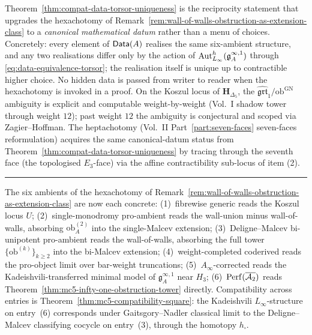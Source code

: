 \begin{remark}
\label{rem:compat-data-reciprocity-canonical}
%
Theorem~\textup{\ref{thm:compat-data-torsor-uniqueness}} is the
reciprocity statement that upgrades the hexachotomy of
Remark~\textup{\ref{rem:wall-of-walls-obstruction-as-extension-class}}
to a \emph{canonical mathematical datum} rather than a menu of choices.
Concretely: every element of $\mathsf{Data}(A)$ realises the same six-ambient
structure, and any two realisations differ only by the action of
$\operatorname{Aut}^h_{L_\infty}(\mathfrak g^{\infty,1}_A)$ through
\eqref{eq:data-equivalence-torsor}; the realisation itself is unique up
to contractible higher choice. No hidden data is passed from writer to
reader when the hexachotomy is invoked in a proof. On the Koszul locus
of $\mathbf H_{\Delta_5}$, the $\widehat{\mathfrak{grt}}_1/\mathrm{ob}^{\mathrm{GN}}$
ambiguity is explicit and computable weight-by-weight (Vol.\ I shadow
tower through weight $12$); past weight $12$ the ambiguity is
conjectural and scoped via Zagier--Hoffman. The heptachotomy (Vol.\ II
Part~\textup{\ref{part:seven-faces}} seven-faces
reformulation) acquires the same canonical-datum status from
Theorem~\textup{\ref{thm:compat-data-torsor-uniqueness}} by tracing
through the seventh face (the topologised $E_3$-face) via the affine
contractibility sub-locus of item (2).
\end{remark}

\begin{center}
\rule{0.3\textwidth}{0.4pt}
\end{center}

\begin{remark}
\label{rem:mc5-infty-one-hexachotomy-placement}
%
The six ambients of the hexachotomy of
Remark~\textup{\ref{rem:wall-of-walls-obstruction-as-extension-class}}
are now each concrete:
(1)~fibrewise generic reads the Koszul locus $U$;
(2)~single-monodromy pro-ambient reads the wall-union minus
wall-of-walls, absorbing $\mathrm{ob}^{(2)}_A$ into the
single-Malcev extension;
(3)~Deligne--Malcev bi-unipotent pro-ambient reads the
wall-of-walls, absorbing the full tower
$\{\mathrm{ob}^{(k)}\}_{k\ge 2}$ into the bi-Malcev extension;
(4)~weight-completed coderived reads the pro-object limit over
bar-weight truncations;
(5)~$A_\infty$-corrected reads the Kadeishvili-transferred minimal
model of $\mathfrak{g}^{\infty,1}_A$ near $H_3$;
(6)~$\mathrm{Perf}(\overline{\mathcal{A}_2})$ reads
Theorem~\textup{\ref{thm:mc5-infty-one-obstruction-tower}} directly.
Compatibility across entries is
Theorem~\textup{\ref{thm:mc5-compatibility-square}}: the
Kadeishvili $L_\infty$-structure on entry~(6) corresponds under
Gaitsgory--Nadler classical limit to the Deligne--Malcev classifying
cocycle on entry~(3), through the homotopy $h_\square$.
\end{remark}

